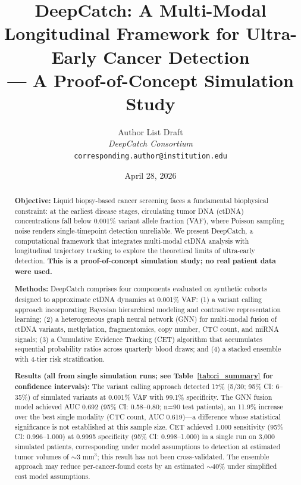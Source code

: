 \documentclass[10pt,a4paper]{article}
\title{\textbf{DeepCatch: A Multi-Modal Longitudinal Framework for Ultra-Early Cancer Detection \\— A Proof-of-Concept Simulation Study}}
\author{
  {Author List Draft}\\
  \textit{DeepCatch Consortium}\\
  \texttt{corresponding.author@institution.edu}
}
\date{April 28, 2026}
\begin{document}
\maketitle


\begin{abstract}
\textbf{Objective:} Liquid biopsy-based cancer screening faces a fundamental biophysical constraint: at the earliest disease stages, circulating tumor DNA (ctDNA) concentrations fall below 0.001\% variant allele fraction (VAF), where Poisson sampling noise renders single-timepoint detection unreliable. We present DeepCatch, a computational framework that integrates multi-modal ctDNA analysis with longitudinal trajectory tracking to explore the theoretical limits of ultra-early detection. \textbf{This is a proof-of-concept simulation study; no real patient data were used.}

\textbf{Methods:} DeepCatch comprises four components evaluated on synthetic cohorts designed to approximate ctDNA dynamics at 0.001\% VAF: (1) a variant calling approach incorporating Bayesian hierarchical modeling and contrastive representation learning; (2) a heterogeneous graph neural network (GNN) for multi-modal fusion of ctDNA variants, methylation, fragmentomics, copy number, CTC count, and miRNA signals; (3) a Cumulative Evidence Tracking (CET) algorithm that accumulates sequential probability ratios across quarterly blood draws; and (4) a stacked ensemble with 4-tier risk stratification.

\textbf{Results (all from single simulation runs; see Table~\ref{tab:ci_summary} for confidence intervals):} The variant calling approach detected 17\% (5/30; 95\% CI: 6--35\%) of simulated variants at 0.001\% VAF with 99.1\% specificity. The GNN fusion model achieved AUC 0.692 (95\% CI: 0.58--0.80; n=90 test patients), an 11.9\% increase over the best single modality (CTC count, AUC 0.619)—a difference whose statistical significance is not established at this sample size. CET achieved 1.000 sensitivity (95\% CI: 0.996--1.000) at 0.9995 specificity (95\% CI: 0.998--1.000) in a single run on 3,000 simulated patients, corresponding under model assumptions to detection at estimated tumor volumes of $\sim$3 mm$^3$; this result has not been cross-validated. The ensemble approach may reduce per-cancer-found costs by an estimated $\sim$40\% under simplified cost model assumptions.


\end{abstract}
\end{document}
